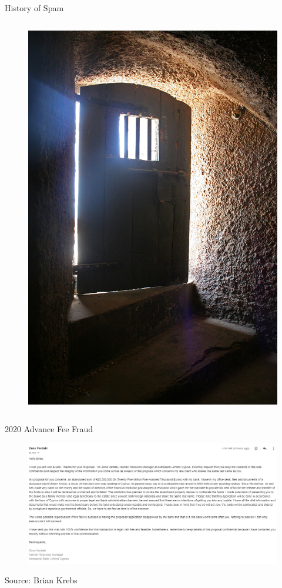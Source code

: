 \documentclass[nobackground,dvipsnames,table,aspectratio=169]{beamer}
\begin{document}
\begin{frame}{History of Spam}
\begin{columns}
            \begin{figure}
                \centering
                \includegraphics[width=\textwidth]{prison-door}
            \end{figure}
    \end{columns}
\end{frame}

\begin{frame}{2020 Advance Fee Fraud}
    \begin{figure}
        \centering
        \includegraphics[width=\textwidth]{advance-fee-fraud}
    \end{figure}
    Source: Brian Krebs
\end{frame}
\end{document}
